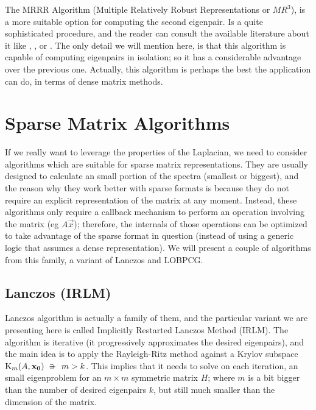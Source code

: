 The MRRR Algorithm (Multiple Relatively Robust Representations or
$MR^3$), is a more suitable option for computing the second
eigenpair. Is a quite sophisticated procedure, and the reader
can consult the available literature about it like \cite{dhillon97},
\cite{dhillon04}, \cite{dhillon06} or \cite{parlett04}. The only
detail we will mention here, is that this algorithm is capable of
computing eigenpairs in isolation; so it has a considerable advantage
over the previous one. Actually, this algorithm is perhaps the best
the application can do, in terms of dense matrix methods.


\section{Sparse Matrix Algorithms}

If we really want to leverage the properties of the Laplacian, we need
to consider algorithms which are suitable for sparse matrix
representations. They are usually designed to calculate an small
portion of the spectra (smallest or biggest), and the reason why they
work better with sparse formats is because they do not require
an explicit representation of the matrix at any moment. Instead, these
algorithms only require a callback mechanism to perform an operation
involving the matrix (eg $A\vec{x}$); therefore, the internals of
those operations can be optimized to take advantage of the sparse
format in question (instead of using a generic logic that assumes a
dense representation). We will present a couple of algorithms from
this family, a variant of Lanczos and LOBPCG.

\subsection{Lanczos (IRLM)}

Lanczos algorithm is actually a family of them, and the particular
variant we are presenting here is called Implicitly Restarted Lanczos
Method (IRLM). The algorithm is iterative (it progressively approximates the
desired eigenpairs), and the main idea is to apply the Rayleigh-Ritz
method against a Krylov subspace $\Krylov{A}{\vec{x_0}}{m} \suchthat m
> k$. This implies that it needs to solve on each iteration, an small
eigenproblem for an $m \times m$ symmetric matrix $H$; where $m$ is a bit bigger
than the number of desired eigenpairs $k$, but still much smaller than the
dimension of the matrix. \\

